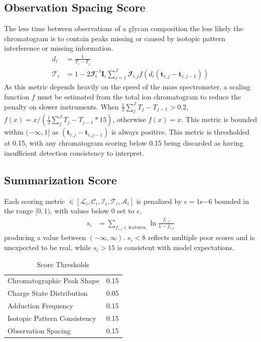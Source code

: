     \subsection{Observation Spacing Score}
        The less time between observations of a glycan composition the less likely the chromatogram
        is to contain peaks missing or caused by isotopic pattern interference or missing information.
        \begin{align}
            d_i &= \frac{1}{T_i - T_j} \nonumber\\
            \mathscr{T}_i &= 1 - 2\mathbfcal{I}_i^{-t}\mathbf{I}_i\sum_{j=1}^J\mathbfcal{I}_{i, j}
                             f\left(d_i\left(\mathbf{t}_{i, j} - \mathbf{t}_{i, j - 1}\right)\right)
        \end{align}
        As this metric depends heavily on the speed of the mass spectrometer, a scaling function $f$
        must be estimated from the total ion chromatogram to reduce the penalty on slower instruments.
        When $\frac{1}{J}\sum_{j}^{J}{T_j - T_{j - 1}} > 0.2$, $f(x) = x / \left(\frac{1}{J}
        \sum_{j}^{J}{T_j - T_{j - 1}} * 15\right)$, otherwise $f(x) = x$. This metric is bounded within
        $(-\infty, 1]$ as $\left(\mathbf{t}_{i, j} - \mathbf{t}_{i, j - 1}\right)$ is always positive.
        This metric is thresholded at 0.15, with any chromatogram scoring below 0.15 being discarded
        as having insufficient detection consistency to interpret.

    \subsection{Summarization Score}
        Each scoring metric $\in \left[\mathscr{L}_i, \mathscr{C}_i, \mathscr{I}_i,
        \mathscr{T}_i, \mathscr{A}_i\right]$ is penalized by $\epsilon = 1\mathrm{e}{-6}$ bounded in
        the range $[0, 1)$, with values below 0 set to $\epsilon$.
        \begin{align}
            s_i &= \sum_{f_{i,j} \in \text{features}_i}{\ln{
                \frac{f_{i, j}}{1 - f_{i, j}}
                }
            }
        \end{align}
        producing a value between $(-\infty, \infty)$. $s_i < 8$ reflects multiple
        poor scores and is unexpected to be real, while $s_i > 15$ is
        consistent with model expectations.

\begin{table}
        \caption{Score Thresholds}\label{tbl:feature_score_thresholds}
        \centering
        \begin{tabular}{l | S}
            \hline
            Chromatographic Peak Shape & 0.15 \\
            Charge State Distribution & 0.05 \\
            Adduction Frequency & 0.15 \\
            Isotopic Pattern Consistency & 0.15 \\
            Observation Spacing & 0.15 \\
        \end{tabular}
    \end{table}